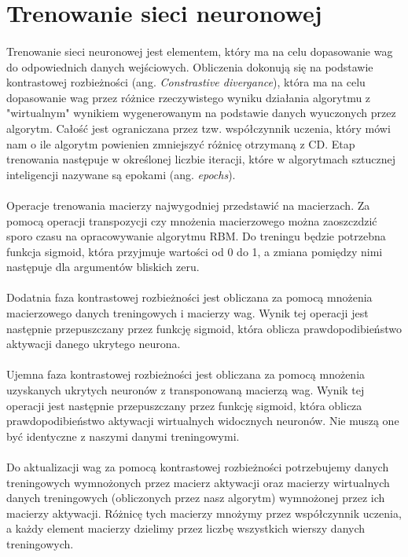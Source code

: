 \section{Trenowanie sieci neuronowej}
    \paragraph{}
        Trenowanie sieci neuronowej jest elementem, który ma na celu dopasowanie wag do odpowiednich danych wejściowych.
        Obliczenia dokonują się na podstawie kontrastowej rozbieżności (ang. \textit{Constrastive divergance}), która ma na celu
        dopasowanie wag przez różnice rzeczywistego wyniku działania algorytmu z "wirtualnym" wynikiem wygenerowanym na
        podstawie danych wyuczonych przez algorytm. Całość jest ograniczana przez tzw. współczynnik uczenia, który mówi
        nam o ile algorytm powienien zmniejszyć różnicę otrzymaną z CD. Etap trenowania następuje w określonej liczbie iteracji,
        które w algorytmach sztucznej inteligencji nazywane są epokami
	 (ang. \textit{epochs}).
    \paragraph{}
       Operacje trenowania macierzy najwygodniej przedstawić na macierzach. Za pomocą operacji transpozycji czy mnożenia
       macierzowego można zaoszczdzić sporo czasu na opracowywanie algorytmu RBM. Do treningu będzie potrzebna funkcja sigmoid,
       która przyjmuje wartości od 0 do 1,  a zmiana pomiędzy nimi następuje dla argumentów bliskich zeru.
    \paragraph{}
	 Dodatnia faza kontrastowej rozbieżności jest obliczana za pomocą mnożenia macierzowego danych treningowych i macierzy wag.
	 Wynik tej operacji jest następnie przepuszczany przez funkcję sigmoid, która oblicza prawdopodibieństwo aktywacji danego ukrytego neurona.
    \paragraph{}
	 Ujemna faza kontrastowej rozbieżności jest obliczana za pomocą mnożenia uzyskanych ukrytych neuronów z transponowaną
	 macierzą wag. Wynik tej operacji jest następnie przepuszczany przez funkcję sigmoid, która oblicza prawdopodibieństwo aktywacji
     wirtualnych widocznych neuronów. Nie muszą one być identyczne z naszymi danymi treningowymi.
    \paragraph{}
	 Do aktualizacji wag za pomocą kontrastowej rozbieżności potrzebujemy danych treningowych wymnożonych przez macierz aktywacji
	 oraz macierzy wirtualnych danych treningowych (obliczonych przez nasz algorytm) wymnożonej przez ich macierzy aktywacji.
	 Różnicę tych macierzy mnożymy przez współczynnik uczenia, a każdy element macierzy dzielimy przez liczbę wszystkich wierszy danych treningowych.
